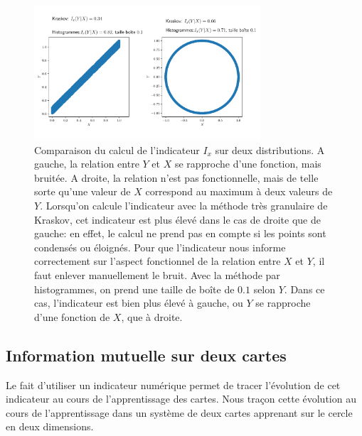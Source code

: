 \begin{figure}
    \centering
    \includegraphics[width=0.75\textwidth]{comparaison_binning_kraskov.pdf}
    \caption{Comparaison du calcul de l'indicateur $I_x$ sur deux distributions. A gauche, la relation entre $Y$ et $X$ se rapproche d'une fonction, mais bruitée. A droite, la relation n'est pas fonctionnelle, mais de telle sorte qu'une valeur de $X$ correspond au maximum à deux valeurs de $Y$. Lorsqu'on calcule l'indicateur avec la méthode très granulaire de Kraskov, cet indicateur est plus élevé dans le cas de droite que de gauche: en effet, le calcul ne prend pas en compte si les points sont condensés ou éloignés. Pour que l'indicateur nous informe correctement sur l'aspect fonctionnel de la relation entre $X$ et $Y$, il faut enlever manuellement le bruit. Avec la méthode par histogrammes, on prend une taille de boîte de $0.1$ selon $Y$. Dans ce cas, l'indicateur est bien plus élevé à gauche, ou $Y$ se rapproche d'une fonction de $X$, que à droite.}
    \label{fig:exemple-limite}
    \end{figure}




\subsection{Information mutuelle sur deux cartes}

Le fait d'utiliser un indicateur numérique permet de tracer l'évolution de cet indicateur au cours de l'apprentissage des cartes. Nous traçon cette évolution au cours de l'apprentissage dans un système de deux cartes apprenant sur le cercle en deux dimensions.

